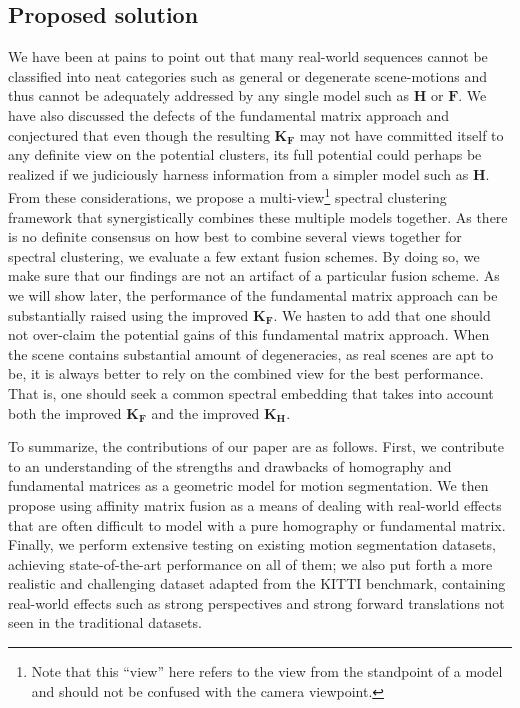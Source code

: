 \documentclass[10pt,twocolumn,letterpaper]{article}
\begin{document}
\subsection{Proposed solution}
We have been at pains to point out that many real-world sequences cannot be classified into neat categories such as general or degenerate scene-motions and thus cannot be adequately addressed by any single model such as $\mathbf{H}$ or $\mathbf{F}$. We have also discussed the defects of the fundamental matrix approach and conjectured that even though the resulting $\mathbf{K_F}$ may not have committed itself to any definite view on the potential clusters, its full potential could perhaps be realized if we judiciously harness information from a simpler model such as $\mathbf{H}$. From these considerations, we propose a multi-view\footnote{Note that this ``view'' here refers to the view from the standpoint of a model and should not be confused with the camera viewpoint.} spectral clustering framework that synergistically combines these multiple models together. As there is no definite consensus on how best to combine several views together for spectral clustering, we evaluate a few extant fusion schemes. By doing so, we make sure that our findings are not an artifact of a particular fusion scheme. As we will show later, the performance of the fundamental matrix approach can be substantially raised using the improved $\mathbf{K_F}$. 
We hasten to add that one should not over-claim the potential gains of this fundamental matrix approach. When the scene contains substantial amount of degeneracies, as real scenes are apt to be, it is always better to rely on the combined view for the best performance. That is, one should seek a common spectral embedding that takes into account both the improved $\mathbf{K_F}$ and the improved $\mathbf{K_H}$.

To summarize, the contributions of our paper are as follows. First, we contribute to an understanding of the strengths and drawbacks of homography and fundamental matrices as a geometric model for motion segmentation. We then propose using affinity matrix fusion as a means of dealing with real-world effects that are often difficult to model with a pure homography or fundamental matrix. Finally, we perform extensive testing on existing motion segmentation datasets, achieving state-of-the-art performance on all of them; we also put forth a more realistic and challenging dataset adapted from the KITTI benchmark, containing real-world effects such as strong perspectives and strong forward translations not seen in the traditional datasets.
\end{document}
